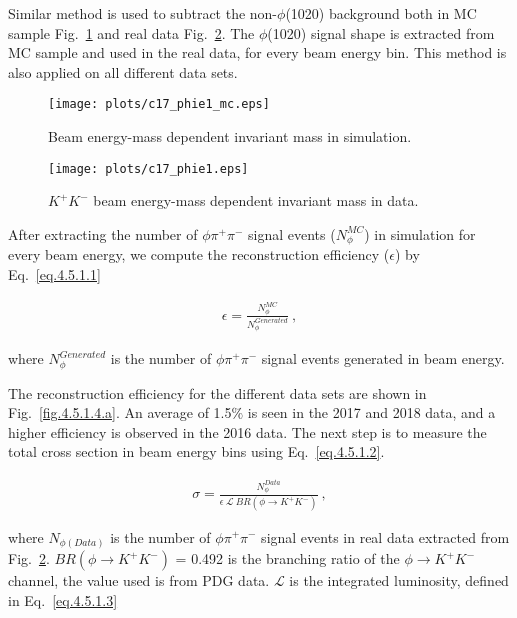 Similar method is used to subtract the non-$\phi$(1020) background both in MC sample Fig.~\ref{fig.4.5.1.2} and real data Fig.~\ref{fig.4.5.1.3}. The $\phi$(1020) signal shape is extracted from MC sample and used in the real data, for every beam energy bin. This method is also applied on all different data sets.

\begin{figure}[H]
    \centering
    \texttt{[image: plots/c17\_phie1\_mc.eps]}
    \caption{\label{fig.4.5.1.2}Beam energy-mass dependent invariant mass in simulation.}
\end{figure}

\begin{figure}[H]
    \centering
    \texttt{[image: plots/c17\_phie1.eps]}
    \caption{\label{fig.4.5.1.3}$K^+ K^-$ beam energy-mass dependent invariant mass in data.}
\end{figure}

After extracting the number of $\phi \pi^+ \pi^-$ signal events ($N_{\phi}^{MC}$) in simulation for every beam energy, we compute the reconstruction efficiency ($\epsilon$) by Eq.~\ref{eq.4.5.1.1}

\begin{equation}
    \label{eq.4.5.1.1}
    \begin{aligned}
        \epsilon=\frac{N_{\phi}^{MC}}{N_{\phi}^{Generated}}~,
    \end{aligned}
\end{equation}

where $N_{\phi}^{Generated}$ is the number of $\phi \pi^+ \pi^-$ signal events generated in beam energy.
\par The reconstruction efficiency for the different data sets are shown in Fig.~\ref{fig.4.5.1.4.a}. An average of 1.5$\%$ is seen in the 2017 and 2018 data, and a higher efficiency is observed in the 2016 data.
The next step is to measure the total cross section in beam energy bins using Eq.~\ref{eq.4.5.1.2}.

\begin{equation}
    \label{eq.4.5.1.2}
    \begin{aligned}
        \sigma = \frac{N_{\phi}^{Data}}{\epsilon~\mathcal{L}~BR(\phi\rightarrow K^{+}K^{-})}~,
    \end{aligned}
\end{equation}

where $N_{\phi(Data)}$ is the number of $\phi \pi^+ \pi^-$ signal events in real data extracted from Fig.~\ref{fig.4.5.1.3}. $BR(\phi\rightarrow K^{+}K^{-})$ = 0.492 is the branching ratio of the $\phi\rightarrow K^{+}K^{-}$ channel, the value used is from PDG data. $\mathcal{L}$ is the integrated luminosity, defined in Eq.~\ref{eq.4.5.1.3}

